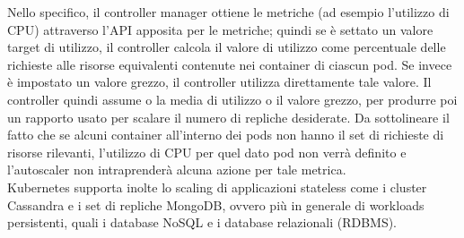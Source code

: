\documentclass[12pt, a4paper]{report}
\begin{document}
Nello specifico, il controller manager ottiene le metriche (ad esempio l'utilizzo di CPU) attraverso l'API apposita per le metriche; quindi se è settato un valore target di utilizzo, il controller calcola il valore di utilizzo come percentuale delle richieste alle risorse equivalenti contenute nei container di ciascun pod. Se invece è impostato un valore grezzo, il controller utilizza direttamente tale valore. Il controller quindi assume o la media di utilizzo o il valore grezzo, per produrre poi un rapporto usato per scalare il numero di repliche desiderate. Da sottolineare il fatto che se alcuni container all'interno dei pods non hanno il set di richieste di risorse rilevanti, l'utilizzo di CPU per quel dato pod non verrà definito e l'autoscaler non intraprenderà alcuna azione per tale metrica.\\
Kubernetes supporta inolte lo scaling di applicazioni stateless come i cluster Cassandra e i set di repliche MongoDB, ovvero più in generale di workloads persistenti, quali i database NoSQL e i database relazionali (RDBMS).
\end{document}

